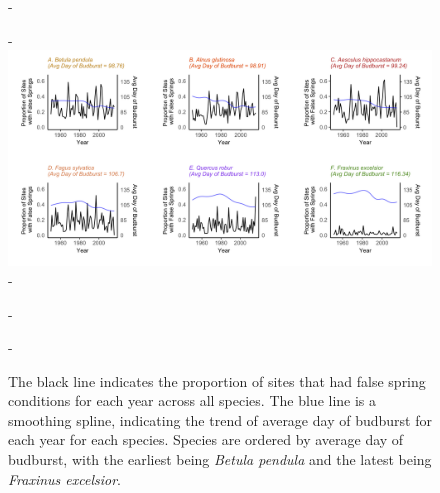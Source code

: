 \documentclass{article}\usepackage[]{graphicx}\usepackage[]{color}
\begin{document}
{\begin{figure} [H]
  -\begin{center}
  -\includegraphics[width=14cm]{..//figures/PropSitesbyYrwBB.png}
  -\caption{The black line indicates the proportion of sites that had false spring conditions for each year across all species. The blue line is a smoothing spline, indicating the trend of average day of budburst for each year for each species. Species are ordered by average day of budburst, with the earliest being \textit{Betula pendula} and the latest being \textit{Fraxinus excelsior}.}\label{fig:fsprop}
  -\end{center}
  -\end{figure}}
  
\end{document}
